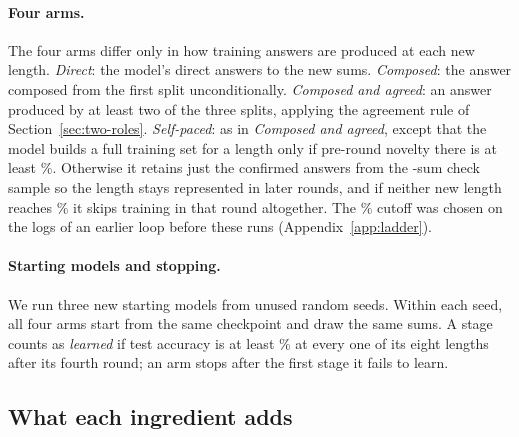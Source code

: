\paragraph{Four arms.}
The four arms differ only in how training answers are produced at each new
length.
\emph{Direct}: the model's direct answers to the new sums.
\emph{Composed}: the answer composed from the first split unconditionally.
\emph{Composed and agreed}: an answer produced by at least two of the three
splits, applying the agreement rule of Section~\ref{sec:two-roles}.
\emph{Self-paced}: as in \emph{Composed and agreed}, except that the model
builds a full training set for a length only if pre-round novelty there is at
least \gpLadThreshold\%. Otherwise it retains just the confirmed answers from
the \gpLadCheckSums{}-sum check sample so the length stays represented in
later rounds, and if neither new length reaches \gpLadThreshold\% it skips
training in that round altogether. The \gpLadThreshold\% cutoff was chosen on
the logs of an earlier loop before these runs
(Appendix~\ref{app:ladder}).

\paragraph{Starting models and stopping.}
We run three new starting models from unused random seeds. Within each seed,
all four arms start from the same checkpoint and draw the same sums. A stage
counts as \emph{learned} if test accuracy is at least \gpLadLearnedLevel\% at
every one of its eight lengths after its fourth round; an arm stops after the
first stage it fails to learn.

\subsection{What each ingredient adds}
\label{sec:ladder-result}

